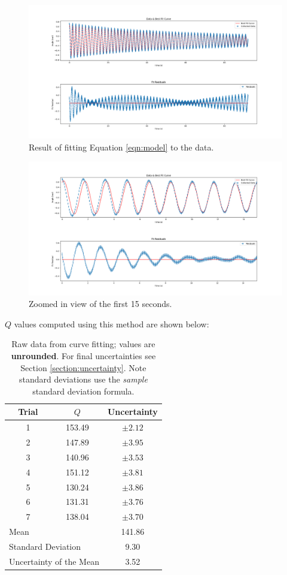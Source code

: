 \documentclass[aps,twocolumn,secnumarabic,nobalancelastpage,amsmath,amssymb,nofootinbib]{revtex4}
\begin{document}
\begin{figure}[htb]
    \includegraphics[width=\linewidth]{fit1.png}
    \caption{Result of fitting Equation \ref{eqn:model} to the data.}
    \label{fig:fit}
\end{figure}
\begin{figure}[htb]
    \includegraphics[width=\linewidth]{fit2.png}
    \caption{Zoomed in view of the first 15 seconds.}
    \label{fig:fitzoom}
\end{figure}

\(Q\) values computed using this method are shown below:
\begin{table}[h]
    \begin{tabular}{ccc}
        Trial & \(Q\) & Uncertainty \\
        \hline
        1   & 153.49    & \(\pm 2.12\) \\
        2   & 147.89    & \(\pm 3.95\) \\
        3	& 140.96	& \(\pm 3.53\) \\
        4	& 151.12	& \(\pm 3.81\) \\
        5	& 130.24	& \(\pm 3.86\) \\
        6	& 131.31	& \(\pm 3.76\) \\
        7	& 138.04	& \(\pm 3.70\) \\
        \hline
        \multicolumn{2}{l}{Mean} & 141.86 \\
        \multicolumn{2}{l}{Standard Deviation} & 9.30 \\
        \multicolumn{2}{l}{Uncertainty of the Mean} & 3.52
    \end{tabular}
    \caption{Raw data from curve fitting; values are \textbf{unrounded}. For final uncertainties see Section
        \ref{section:uncertainty}. Note standard deviations use the \textit{sample} standard deviation formula.}
\end{table}
\end{document}
